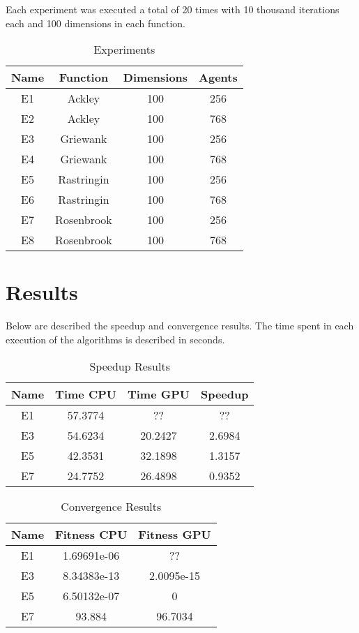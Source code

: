 \documentclass[conference]{IEEEtran}
\begin{document}
Each experiment was executed a total of 20 times with 10 thousand iterations each and 100 dimensions in each function.

\begin{table}[!htbp]
    \renewcommand{\arraystretch}{1.3}
    \caption{Experiments}
    \label{experiments}
    \centering
    \begin{tabular}{c|c|c|c}
    \hline
        \bf Name & Function &  Dimensions & Agents\\
    \hline
        E1 & Ackley & 100 & 256\\
        E2 & Ackley & 100 & 768\\
        E3 & Griewank & 100 & 256\\
        E4 & Griewank & 100 & 768\\
        E5 & Rastringin & 100 & 256\\
        E6 & Rastringin & 100 & 768\\
        E7 & Rosenbrook & 100 & 256\\
        E8 & Rosenbrook & 100 & 768\\
    \end{tabular}
\end{table}

\section{Results}

Below are described the speedup and convergence results. The time spent
in each execution of the algorithms is described in seconds.

\begin{table}[!t]
    \renewcommand{\arraystretch}{1.3}
    \caption{Speedup Results}
    \label{results}
    \centering
    \begin{tabular}{c|c|c|c}
    \hline
        \bf Name & Time CPU & Time GPU & Speedup\\
    \hline
        E1 & 57.3774 & ?? & ?? \\
        E3 & 54.6234 & 20.2427 & 2.6984 \\
        E5 & 42.3531 & 32.1898 & 1.3157 \\
        E7 & 24.7752 & 26.4898 & 0.9352 \\
    \end{tabular}
\end{table}

\begin{table}[!t]
    \renewcommand{\arraystretch}{1.3}
    \caption{Convergence Results}
    \label{results}
    \centering
    \begin{tabular}{c|c|c}
    \hline
        \bf Name & Fitness CPU & Fitness GPU \\
    \hline
        E1 & 1.69691e-06 & ?? \\
        E3 & 8.34383e-13 &  2.0095e-15  \\
        E5 & 6.50132e-07 & 0 \\
        E7 & 93.884 & 96.7034 & \\
    \end{tabular}
\end{table}
\end{document}
